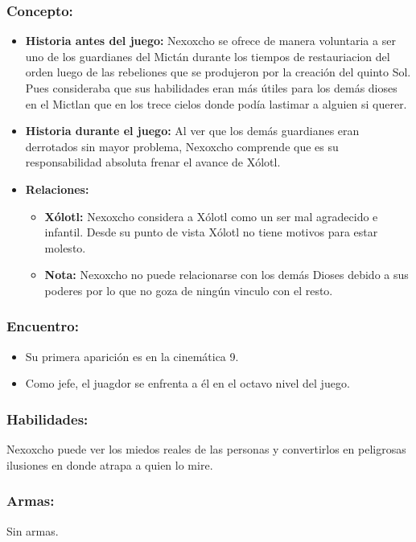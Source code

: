\documentclass[11pt,letterpaper]{article}
\begin{document}
\subsubsection{Concepto:}
\begin{itemize}
	\item \textbf{Historia antes del juego:}
	Nexoxcho se ofrece de manera voluntaria a ser uno de los guardianes del Mictán durante los tiempos de restauriacion del orden luego de las rebeliones que se produjeron por la creación del quinto Sol. Pues consideraba que sus habilidades eran más útiles para los demás dioses en el Mictlan que en los trece cielos donde podía lastimar a alguien si querer.
	\item \textbf{Historia durante el juego:}
	Al ver que los demás guardianes eran derrotados sin mayor problema, Nexoxcho comprende que es su responsabilidad  absoluta frenar el avance de Xólotl.
	\item \textbf{Relaciones:}
	\begin{itemize}
		\item \textbf{Xólotl:} Nexoxcho considera a Xólotl como un ser mal agradecido e infantil. Desde su punto de vista Xólotl no tiene motivos para estar molesto. 
		\item \textbf{Nota:} Nexoxcho no puede relacionarse con los demás Dioses debido a sus poderes por lo que no goza de ningún vinculo con el resto. 
	\end{itemize}                     
\end{itemize}

\subsubsection{Encuentro:}
\begin{itemize}
	\item Su primera aparición es en la cinemática 9.
	\item Como jefe, el juagdor se enfrenta a él en el octavo nivel del juego.
\end{itemize}

\subsubsection{Habilidades:}
Nexoxcho puede ver los miedos reales de las personas y convertirlos en peligrosas ilusiones en donde atrapa a quien lo mire.  

\subsubsection{Armas:}
Sin armas.
\end{document}
